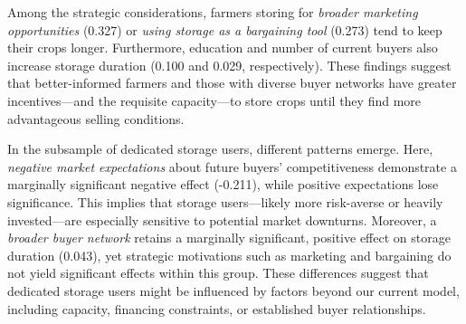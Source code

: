 \documentclass[12pt]{article}
\begin{document}
Among the strategic considerations, farmers storing for \textit{broader marketing opportunities} (0.327) or \textit{using storage as a bargaining tool} (0.273) tend to keep their crops longer. Furthermore, education and number of current buyers also increase storage duration (0.100 and 0.029, respectively). These findings suggest that better-informed farmers and those with diverse buyer networks have greater incentives—and the requisite capacity—to store crops until they find more advantageous selling conditions.

In the subsample of dedicated storage users, different patterns emerge. Here, \textit{negative market expectations} about future buyers' competitiveness demonstrate a marginally significant negative effect (-0.211), while positive expectations lose significance. This implies that storage users—likely more risk-averse or heavily invested—are especially sensitive to potential market downturns. Moreover, a \textit{broader buyer network} retains a marginally significant, positive effect on storage duration (0.043), yet strategic motivations such as marketing and bargaining do not yield significant effects within this group. These differences suggest that dedicated storage users might be influenced by factors beyond our current model, including capacity, financing constraints, or established buyer relationships.



\newpage

\end{document}

